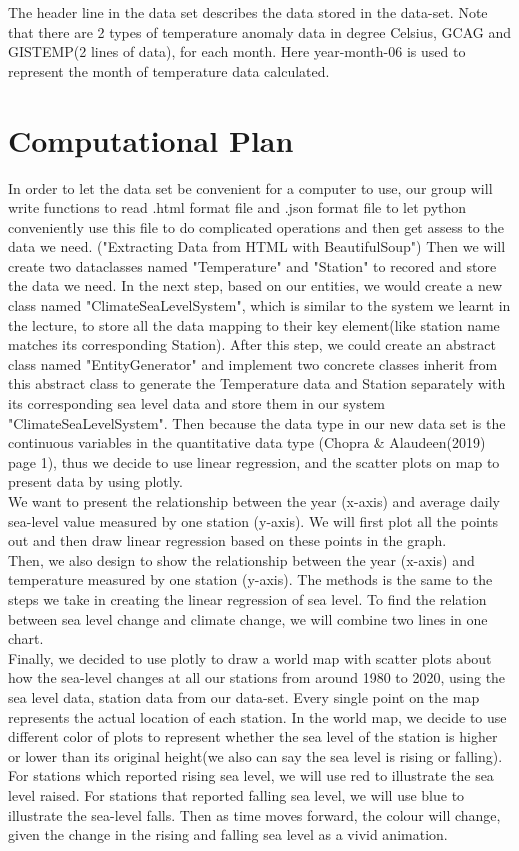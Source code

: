 \documentclass[fontsize=11pt]{article}
\begin{document}
    \newpage
    The header line in the data set describes the data stored in the data-set. Note that there are 2 types of temperature anomaly data in degree Celsius, GCAG and GISTEMP(2 lines of data), for each month. Here year-month-06 is used to represent the month of temperature data calculated.

    \section*{Computational Plan}

    In order to let the data set be convenient for a computer to use, our group will write functions to read .html format file and .json format file to let python conveniently use this file to do complicated operations and then get assess to the data we need. ("Extracting Data from HTML with BeautifulSoup") Then we will create two dataclasses named "Temperature" and "Station" to recored and store the data we need. In the next step, based on our entities, we would create a new class named "ClimateSeaLevelSystem", which is similar to the system we learnt in the lecture, to store all the data mapping to their key element(like station name matches its corresponding Station). After this step, we could create an abstract class named "EntityGenerator"  and implement two concrete classes inherit from this abstract class to generate the Temperature data and Station separately with its corresponding sea level data and store them in our system "ClimateSeaLevelSystem". Then because the data type in our new data set is the continuous variables in the quantitative data type (Chopra \& Alaudeen(2019) page 1), thus we decide to use linear regression, and the scatter plots on map to present data by using plotly.\\
    We want to present the relationship between the year (x-axis) and average daily sea-level value measured by one station (y-axis). We will first plot all the points out and then draw linear regression based on these points in the graph.\\
    Then, we also design to show the relationship between the year (x-axis) and temperature measured by one station (y-axis). The methods is the same to the steps we take in creating the linear regression of sea level. To find the relation between sea level change and climate change, we will combine two lines in one chart. \\
    Finally, we decided to use plotly to draw a world map with scatter plots about how the sea-level changes at all our stations from around 1980 to 2020, using the sea level data, station data from our data-set. Every single point on the map represents the actual location of each station. In the world map, we decide to use different color of plots to represent whether the sea level of the station is higher or lower than its original height(we also can say the sea level is rising or falling). For stations which reported rising sea level, we will use red to illustrate the sea level raised. For stations that reported falling sea level, we will use blue to illustrate the sea-level falls. Then as time moves forward, the colour will change, given the change in the rising and falling sea level as a vivid animation.\\
\end{document}
